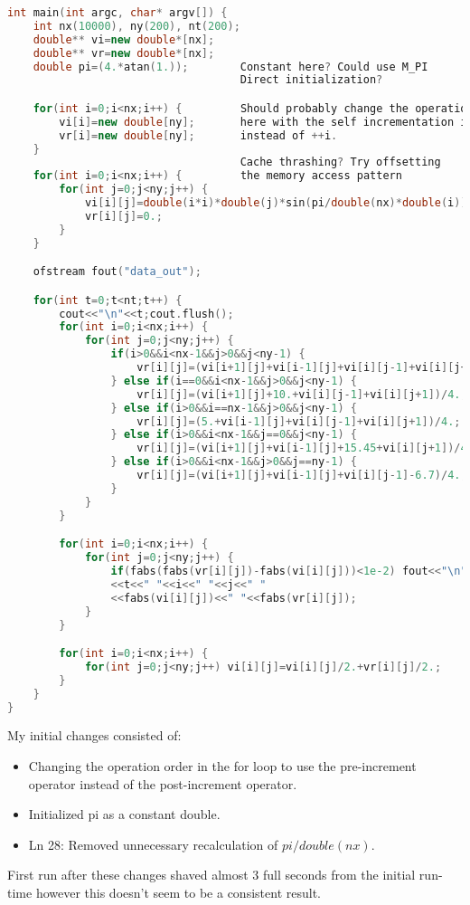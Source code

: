 \documentclass[11pt]{report}
\begin{document}
\begin{lstlisting}[language=C++, caption=Original code listing]
int main(int argc, char* argv[]) {
    int nx(10000), ny(200), nt(200);        
    double** vi=new double*[nx];
    double** vr=new double*[nx];
    double pi=(4.*atan(1.));        Constant here? Could use M_PI 
                                    Direct initialization?

    for(int i=0;i<nx;i++) {         Should probably change the operation order 
        vi[i]=new double[ny];       here with the self incrementation ie. ++i
        vr[i]=new double[ny];       instead of ++i. 
    }
                                    Cache thrashing? Try offsetting
    for(int i=0;i<nx;i++) {         the memory access pattern 
        for(int j=0;j<ny;j++) {       
            vi[i][j]=double(i*i)*double(j)*sin(pi/double(nx)*double(i));  pi/double(nx) x
            vr[i][j]=0.;                                                  in the loop is inefficient
        }
    }

    ofstream fout("data_out");

    for(int t=0;t<nt;t++) {
        cout<<"\n"<<t;cout.flush();
        for(int i=0;i<nx;i++) {
            for(int j=0;j<ny;j++) {
                if(i>0&&i<nx-1&&j>0&&j<ny-1) {
                    vr[i][j]=(vi[i+1][j]+vi[i-1][j]+vi[i][j-1]+vi[i][j+1])/4.;
                } else if(i==0&&i<nx-1&&j>0&&j<ny-1) {
                    vr[i][j]=(vi[i+1][j]+10.+vi[i][j-1]+vi[i][j+1])/4.;
                } else if(i>0&&i==nx-1&&j>0&&j<ny-1) {
                    vr[i][j]=(5.+vi[i-1][j]+vi[i][j-1]+vi[i][j+1])/4.;
                } else if(i>0&&i<nx-1&&j==0&&j<ny-1) {
                    vr[i][j]=(vi[i+1][j]+vi[i-1][j]+15.45+vi[i][j+1])/4.;
                } else if(i>0&&i<nx-1&&j>0&&j==ny-1) {
                    vr[i][j]=(vi[i+1][j]+vi[i-1][j]+vi[i][j-1]-6.7)/4.;
                }
            }
        }

        for(int i=0;i<nx;i++) {
            for(int j=0;j<ny;j++) {
                if(fabs(fabs(vr[i][j])-fabs(vi[i][j]))<1e-2) fout<<"\n"
                <<t<<" "<<i<<" "<<j<<" "
                <<fabs(vi[i][j])<<" "<<fabs(vr[i][j]);
            }
        }

        for(int i=0;i<nx;i++) {
            for(int j=0;j<ny;j++) vi[i][j]=vi[i][j]/2.+vr[i][j]/2.;
        }
    }
}
\end{lstlisting}

My initial changes consisted of:
\begin{itemize}
    \item Changing the operation order in the for loop to use the pre-increment operator instead of the post-increment operator.
    \item Initialized pi as a constant double.
    \item Ln 28: Removed unnecessary recalculation of $pi / double(nx)$.
\end{itemize}
First run after these changes shaved almost 3 full seconds from the initial run-time however this doesn't seem to be a consistent result.
\end{document}
